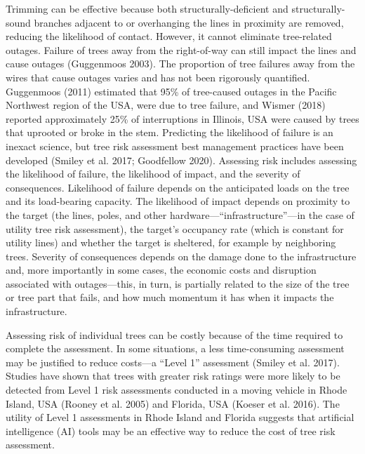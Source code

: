 \documentclass[11pt,twoside]{article}
\numberwithin{equation}{section}
\newcommand{\?}{\stackrel{?}{=}}
\begin{document}
Trimming can be effective because both structurally-deficient and structurally-sound branches adjacent to or overhanging the lines in proximity are removed, reducing the likelihood of contact. 
However, it cannot eliminate tree-related outages. Failure of trees away from the right-of-way can still impact the lines and cause outages (Guggenmoos 2003). The proportion of tree failures away from the wires that cause outages varies and has not been rigorously quantified. Guggenmoos (2011) estimated that 95\% of tree-caused outages in the Pacific Northwest region of the USA, were due to tree failure, and Wismer (2018) reported approximately 25\% of interruptions in Illinois, USA were caused by trees that uprooted or broke in the stem. 
Predicting the likelihood of failure is an inexact science, but tree risk assessment best management practices have been developed (Smiley et al. 2017; Goodfellow 2020). Assessing risk includes assessing the likelihood of failure, the likelihood of impact, and the severity of consequences. Likelihood of failure depends on the anticipated loads on the tree and its load-bearing capacity. The likelihood of impact depends on proximity to the target (the lines, poles, and other hardware—“infrastructure”—in the case of utility tree risk assessment), the target’s occupancy rate (which is constant for utility lines) and whether the target is sheltered, for example by neighboring trees. Severity of consequences depends on the damage done to the infrastructure and, more importantly in some cases, the economic costs and disruption associated with outages—this, in turn, is partially related to the size of the tree or tree part that fails, and how much momentum it has when it impacts the infrastructure.

Assessing risk of individual trees can be costly because of the time required to complete the assessment. In some situations, a less time-consuming assessment may be justified to reduce costs—a ``Level 1'' assessment (Smiley et al. 2017). Studies have shown that trees with greater risk ratings were more likely to be detected from Level 1 risk assessments conducted in a moving vehicle in Rhode Island, USA (Rooney et al. 2005) and Florida, USA (Koeser et al. 2016). The utility of Level 1 assessments in Rhode Island and Florida suggests that artificial intelligence (AI) tools may be an effective way to reduce the cost of tree risk assessment.
\end{document}
